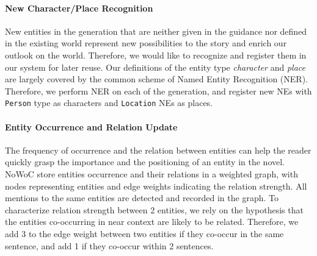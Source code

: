 \documentclass{article}
\begin{document}
\paragraph{New Character/Place Recognition} New entities in the generation that are neither given in the guidance nor defined in the existing world represent
new possibilities to the story and enrich our outlook on the world. 
Therefore, we would like to recognize and register them in our system for later reuse. 
Our definitions of the entity type \textit{character} and \textit{place} are 
largely covered by the common scheme of Named Entity Recognition (NER). 
Therefore, we perform NER on each of the generation, and register new NEs 
with \texttt{Person} type as characters and \texttt{Location} NEs as places.



\paragraph{Entity Occurrence and Relation Update} The frequency of occurrence and the relation between entities can help the reader quickly grasp the importance and the positioning of an entity in the novel. NoWoC store entities occurrence and their relations in a weighted graph, with nodes representing entities and edge weights indicating the relation strength. All mentions to the same entities are detected and recorded
in the graph. To characterize relation strength between 2 entities, we rely on 
the hypothesis that the entities co-occurring in near context are likely to be related. Therefore, we add 3 to the edge weight between two entities if they co-occur in 
the same sentence, and add 1 if they co-occur within 2 sentences. 
\end{document}
